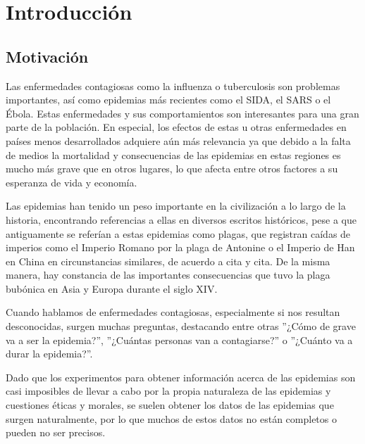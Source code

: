 
\chapter*{Introducción}

\section{Motivación}

Las enfermedades contagiosas como la influenza o tuberculosis son problemas importantes, así como epidemias más recientes como el SIDA, el SARS o el Ébola. Estas enfermedades y sus comportamientos son interesantes para una gran parte de la población. En especial, los efectos de estas u otras enfermedades en países menos desarrollados adquiere aún más relevancia ya que debido a la falta de medios la mortalidad y consecuencias de las epidemias en estas regiones es mucho más grave que en otros lugares, lo que afecta entre otros factores a su esperanza de vida y economía.

Las epidemias han tenido un peso importante en la civilización a lo largo de la historia, encontrando referencias a ellas en diversos escritos históricos, pese a que antiguamente se referían a estas epidemias como plagas, que registran caídas de imperios como el Imperio Romano por la plaga de Antonine o el Imperio de Han en China en circunstancias similares, de acuerdo a cita y cita. De la misma manera, hay constancia de las importantes consecuencias que tuvo la plaga bubónica en Asia y Europa durante el siglo XIV.

Cuando hablamos de enfermedades contagiosas, especialmente si nos resultan desconocidas, surgen muchas preguntas, destacando entre otras ''¿Cómo de grave va a ser la epidemia?'', ''¿Cuántas personas van a contagiarse?'' o ''¿Cuánto va a durar la epidemia?''.

Dado que los experimentos para obtener información acerca de las epidemias son casi imposibles de llevar a cabo por la propia naturaleza de las epidemias y cuestiones éticas y morales, se suelen obtener los datos de las epidemias que surgen naturalmente, por lo que muchos de estos datos no están completos o pueden no ser precisos.

